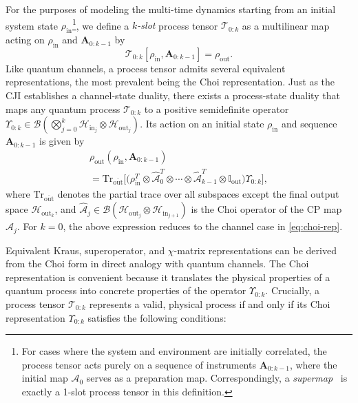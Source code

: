 \documentclass[
    aps,
    prx,
    reprint,
    superscriptaddress,
    longbibliography,
    nofootinbib,
    floatfix,
]{revtex4-2}
\newcommand{\Tr}{\mathrm{Tr}}
\begin{document}
For the purposes of modeling the multi-time dynamics starting from an initial system state \(\rho_\mathrm{in}\)\footnote{For cases where the system and environment are initially correlated, the process tensor acts purely on a sequence of instruments \(\mathbf{A}_{0:k-1}\), where the initial map \(\mathcal{A}_0\) serves as a preparation map. Correspondingly, a \emph{supermap}~\cite{chiribellaQuantumCircuitArchitecture2008} is exactly a 1-slot process tensor in this definition.}, we define a \emph{\(k\)-slot} process tensor \(\mathcal{T}_{0:k}\) as a multilinear map acting on \(\rho_\mathrm{in}\) and \(\mathbf{A}_{0:k-1}\) by
\begin{equation}
\mathcal{T}_{0:k}[\rho_\mathrm{in},\mathbf{A}_{0:k-1}] = \rho_\mathrm{out}.
\end{equation}
Like quantum channels, a process tensor admits several equivalent representations, the most prevalent being the Choi representation. Just as the CJI establishes a channel-state duality, there exists a process-state duality that maps any quantum process \(\mathcal{T}_{0:k}\) to a positive semidefinite operator \(\Upsilon_{0:k} \in \mathcal{B}(\bigotimes_{j=0}^k \mathcal{H}_{\mathrm{in}_j} \otimes \mathcal{H}_{\mathrm{out}_j})\). Its action on an initial state \(\rho_{\mathrm{in}}\) and sequence \(\mathbf{A}_{0:k-1}\) is given by
\begin{multline}\label{eq:pt-choi-rep}
    \rho_\mathrm{out}(\rho_\mathrm{in}, \mathbf{A}_{0:k-1}) \\
    = 
    \Tr_{\overline{\mathrm{out}}} \Big[ \big( \rho_{\mathrm{in}}^T
    \otimes \hat{\mathcal{A}}_0^T \otimes \cdots
    \otimes \hat{\mathcal{A}}_{k-1}^T \otimes \mathbb{I}_{\mathrm{out}} \big)
    \Upsilon_{0:k} \Big],
\end{multline}
where \(\Tr_{\overline{\mathrm{out}}}\) denotes the partial trace over all subspaces except the final output space \(\mathcal{H}_{\mathrm{out}_k}\), and \(\hat{\mathcal{A}}_j \in \mathcal{B}(\mathcal{H}_{\mathrm{out}_j} \otimes \mathcal{H}_{\mathrm{in}_{j+1}})\) is the Choi operator of the CP map \(\mathcal{A}_j\). For \(k=0\), the above expression reduces to the channel case in \cref{eq:choi-rep}.

Equivalent Kraus, superoperator, and \(\chi\)-matrix representations can be derived from the Choi form in direct analogy with quantum channels. The Choi representation is convenient because it translates the physical properties of a quantum process into concrete properties of the operator \(\Upsilon_{0:k}\). Crucially, a process tensor \(\mathcal{T}_{0:k}\) represents a valid, physical process if and only if its Choi representation \(\Upsilon_{0:k}\) satisfies the following conditions:
\end{document}
